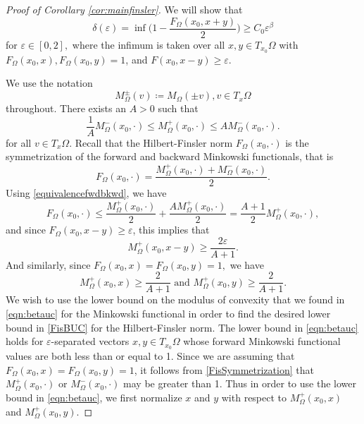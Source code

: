 \documentclass[letterpaper, 11pt, reqno]{amsart}
\theoremstyle{definition}
\begin{document}
\begin{proof}[Proof of Corollary \ref{cor:mainfinsler}]

 We will show that 
 \begin{equation}\label{FisBUC}
        \delta(\varepsilon) = \inf \bigg(1-\frac{F_\Omega(x_0,x+y)}{2}\bigg) \geq C_0 \varepsilon^\beta
    \end{equation}
    for $\varepsilon \in [0,2],$ where the infimum is taken over all $x,y \in T_{x_0}\Omega$ with $F_\Omega(x_0,x), F_\Omega(x_0,y) = 1$, and $F(x_0,x-y) \geq \varepsilon$.

We use the notation 
\begin{equation*}
     M_\Omega^{\pm}(v) \coloneq M_\Omega(\pm v),  v \in T_x\Omega
 \end{equation*}
 throughout.
 There exists an $A > 0$ such that
\begin{equation}\label{equivalencefwdbkwd}
   \frac{1}{A}M_\Omega^-(x_0,\cdot) \leq M_\Omega^+(x_0,\cdot) \leq AM_\Omega^-(x_0,\cdot).
 \end{equation}
 for all $v \in T_x\Omega$. Recall that the Hilbert-Finsler norm $F_\Omega(x_0, \cdot)$ is the symmetrization of the forward and backward Minkowski functionals, that is
 \begin{equation}\label{FisSymmetrization}
     F_\Omega(x_0,\cdot) = \frac{M^+_\Omega(x_0,\cdot) + M^-_\Omega(x_0,\cdot)}{2}.
 \end{equation}
 Using \ref{equivalencefwdbkwd}, we have
 \begin{equation}
  F_\Omega(x_0,\cdot) \leq \frac{M^+_\Omega(x_0,\cdot)}{2} +    \frac{AM^+_\Omega(x_0,\cdot)}{2} = \frac{A+1}{2}M^+_\Omega(x_0,\cdot),
 \end{equation}
and since $F_\Omega(x_0,x-y) \geq \varepsilon$, this implies that
 \begin{equation}\label{unnormalizedlower}
  M^+_\Omega(x_0,x-y) \geq \frac{2\varepsilon}{A+1}.   
 \end{equation}
 And similarly, since $F_\Omega(x_0,x)=F_\Omega(x_0,y)=1,$ we have
 \begin{equation}\label{lowerboundforForward}
   M^+_\Omega(x_0,x) \geq \frac{2}{A+1}  \text{ and } M^+_\Omega(x_0,y) \geq \frac{2}{A+1}.
 \end{equation}
We wish to use the lower bound on the modulus of convexity that we found in \ref{eqn:betauc} for the Minkowski functional in order to find the desired lower bound in \ref{FisBUC} for the Hilbert-Finsler norm. The lower bound in \ref{eqn:betauc} holds for $\varepsilon$-separated vectors $x,y \in T_{x_0}\Omega$ whose forward Minkowski functional values are both less than or equal to 1. Since we are assuming that $F_\Omega(x_0,x)=F_\Omega(x_0,y)=1$, it follows from \ref{FisSymmetrization} that $M^+_\Omega(x_0,\cdot)$ or $M^-_\Omega(x_0,\cdot)$ may be greater than 1. Thus in order to use the lower bound in \ref{eqn:betauc}, we first normalize $x$ and $y$ with respect to $M^+_\Omega(x_0,x)$ and $M^+_\Omega(x_0,y)$.


\end{proof}
\end{document}
